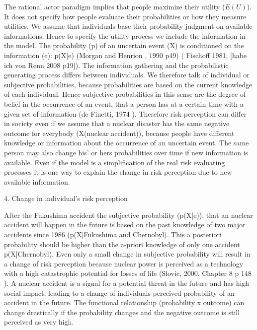The rational actor paradigm  implies that people maximize their utility ($E(U)$). It does not specify how people evaluate their probabilities or how they measure utilities. We assume that individuals base their probability judgment on available informations. Hence to specify the utility process we include the information in the model. The probability (p) of an uncertain event (X) is conditioned on the information (e): p(X|e) (Morgan and Henrion , 1990 p49) ( Fischoff 1981, \citep{Fischhoff:1981tx} [habe ich von Renn 2008 p19]). The information gathering and the probabilistic generating process differs between individuals. We therefore talk of individual or subjective probabilities, because probabilities are based on the current knowledge of each individual. Hence subjective probabilities in this sense are the degree of belief in the occurrence of an event, that a person has at a certain time with a given set of information  (de Finetti, 1974 \citep{deFinetti:1974ua}).   
Therefore risk perception can differ in society even if we assume that a nuclear disaster has the same negative outcome for everybody (X(nuclear accident)), because people have different knowledge or information about the occurrence of an uncertain event. The same person may also change his' or hers probabilities over time if new information is available. Even if the model is a simplification of the real risk evaluating processes it is one way to explain the change in risk perception due to new available information. 



4. Change in individual's risk perception

After the Fukushima accident the subjective probability (p(X|e)), that an nuclear accident will happen in the future is based on the past knowledge of two major accidents since 1986 (p(X|Fukushima and Chernobyl). This a posteriori probability should be higher than the a-priori knowledge of only one accident p(X|Chernobyl). Even only a small change in subjective probability will result in a change of risk perception because nuclear power is perceived as a technology with a high catastrophic potential for losses of life (Slovic, 2000, Chapter 8 p 148   \citep[148]{Slovic:2000tx}). A nuclear accident is a signal for a potential threat in the future and has high social impact, leading to a change of individuals perceived probability of an accident in the future. The functional relationship (probability x outcome) can change drastically if the  probability changes and the negative outcome is still perceived as very high.  

